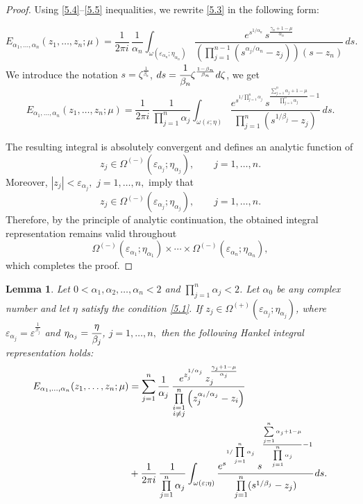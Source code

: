 \documentclass[12pt, reqno]{amsart}
\newtheorem{lemma}[theorem]{Lemma}
\theoremstyle{definition}
\theoremstyle{remark}
\numberwithin{equation}{section}
\begin{document}
\begin{proof}
Using \eqref{5.4}--\eqref{5.5} inequalities, we rewrite \eqref{5.3} in the following form:


\begin{equation}\label{5.6}
E_{\alpha_1,\dots,\alpha_n}(z_1,\dots,z_n;\mu)=
\frac{1}{2\pi i}\,
\frac{1}{\alpha_n}
\int_{\omega(\varepsilon_{\alpha_n};\eta_{\alpha_n})}
\frac{
e^{s^{1/\alpha_n}}
\,s^{\frac{\gamma_n+1-\mu}{\alpha_n}}
}
{
\left(\prod\limits_{j=1}^{n-1}(s^{\alpha_j/\alpha_n}-z_j)\right)(s-z_n)
}
\,ds.
\end{equation}
We introduce the notation
$s=\zeta^{\frac{1}{\beta_n}}$, $ds=\cfrac{1}{\beta_n}\zeta^{\frac{1-\beta_n}{\beta_n}}d\zeta$, we get
$$
E_{\alpha_1, \dots, \alpha_n }(z_1, \dots, z_n;\mu)
=
\frac{1}{2\pi i}\,
\frac{1}{\prod\limits_{{j=1}}^n\alpha_j}
\int_{\omega(\varepsilon;\eta)}
\frac{
e^{s^{1/\prod\limits_{{j=1}}^n\alpha_j}}
\,s^{\frac{\sum\limits_{j=1}^n\alpha_j+1-\mu}{\prod\limits_{j=1}^n\alpha_j}-1}
}
{
\prod\limits_{j=1}^n(s^{1/\beta_j}-z_j)
}
\,ds.
$$

The resulting integral is absolutely convergent and defines an analytic function of
\[
z_j\in\Omega^{(-)}(\varepsilon_{\alpha_j};\eta_{\alpha_j}),\qquad
j=1,\dots,n.
\]
Moreover,
$
|z_j|<\varepsilon_{\alpha_j},\,\, j=1,\dots,n,
$
imply that
\[
z_j\in\Omega^{(-)}(\varepsilon_{\alpha_j};\eta_{\alpha_j}),\qquad
j=1,\dots,n.
\]
Therefore, by the principle of analytic continuation, the obtained integral representation remains valid throughout
\[
\Omega^{(-)}(\varepsilon_{\alpha_1};\eta_{\alpha_1})
\times
\cdots
\times
\Omega^{(-)}(\varepsilon_{\alpha_n};\eta_{\alpha_n}),
\]
which completes the proof.
\end{proof}    

\begin{lemma}\label{l5.2}
    Let $0 < \alpha_1, \alpha_2,\dots,\alpha_n < 2$ and $\prod\limits_{{j=1}}^n\alpha_j < 2$. Let $\alpha_0$ be any complex number and let $\eta$ satisfy the condition \eqref{5.1}.
If
$
z_j \in \Omega^{(+)}({\varepsilon}_{\alpha_j};\eta_{\alpha_j})
$,
where
$
{\varepsilon}_{\alpha_j}={\varepsilon}^{\frac{1}{\beta_j}}$ and $\eta_{\alpha_j}=\cfrac{\eta}{\beta_j}$, $j=1,\dots,n,$
then the following Hankel integral representation holds:
$$\begin{aligned}
E_{\alpha_1, \dots, \alpha_n }(z_1, \dots, z_n;\mu)
&=
\sum_{j=1}^{n}
\frac{1}{\alpha_j}\,
\frac{
e^{z_j^{1/\alpha_j}}
\,z_j^{\frac{\gamma_j+1-\mu}{\alpha_j}}
}{
\prod\limits_{\substack{i=1\\i\neq j}}^{n}
\left(z_j^{\alpha_i/\alpha_j}-z_i\right)
}\\&+
\frac{1}{2\pi i}\,
\frac{1}{\prod\limits_{{j=1}}^n\alpha_j}
\int_{\omega(\varepsilon;\eta)}
\cfrac{
e^{s^{1/\prod\limits_{{j=1}}^n\alpha_j}}
\,s^{\frac{\sum\limits_{j=1}^n\alpha_j+1-\mu}{\prod\limits_{j=1}^n\alpha_j}-1}
}
{
\prod\limits_{j=1}^n(s^{1/\beta_j}-z_j)
}
\,ds.
\end{aligned}$$

\end{lemma}
\end{document}
